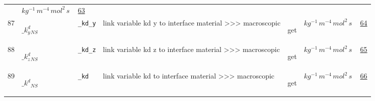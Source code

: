 \begin{longtable}{|p{1cm}|p{2.5cm}|p{4.5cm}|p{8cm}|p{3.0cm}|p{3cm}|p{1cm}|}
             & $ kg^{-1} \,m^{-4} \,mol^{2} \,s \, $
             &                 \hyperlink{"e:63"}{ 63 }
                 \\
            87
             & \hypertarget{"v:87"}{ $ {{\_k^d_y}}{_{{N S}}} $}
             & \verb|_kd_y|
             & link variable kd y to interface material >>> macroscopic
             & \begin{lay}get \end{lay}
             & $ kg^{-1} \,m^{-4} \,mol^{2} \,s \, $
             &                 \hyperlink{"e:64"}{ 64 }
                 \\
            88
             & \hypertarget{"v:88"}{ $ {{\_k^d_z}}{_{{N S}}} $}
             & \verb|_kd_z|
             & link variable kd z to interface material >>> macroscopic
             & \begin{lay}get \end{lay}
             & $ kg^{-1} \,m^{-4} \,mol^{2} \,s \, $
             &                 \hyperlink{"e:65"}{ 65 }
                 \\
            89
             & \hypertarget{"v:89"}{ $ {{\_k^d}}{_{{N S}}} $}
             & \verb|_kd|
             & link variable kd to interface material >>> macroscopic
             & \begin{lay}get \end{lay}
             & $ kg^{-1} \,m^{-4} \,mol^{2} \,s \, $
             &                 \hyperlink{"e:66"}{ 66 }
                 \\
    \end{longtable}